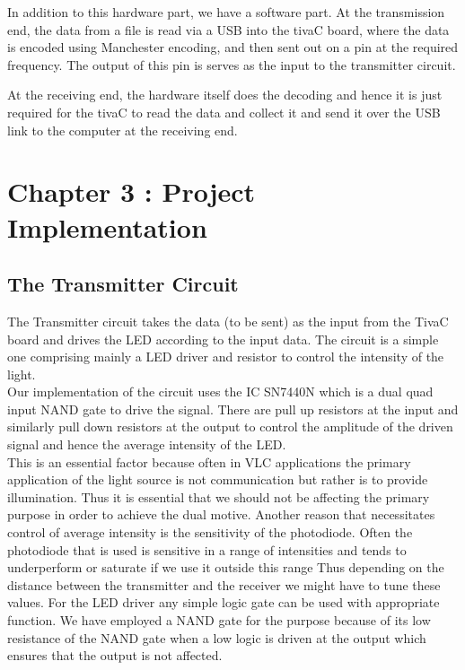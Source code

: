 \documentclass{article}
\begin{document}
In addition to this hardware part,  we have a software part. At the transmission end, the data from a file is read via a USB into the tivaC board, where the data is encoded using Manchester encoding, and then sent out on a pin at the required frequency. The output of this pin is serves as the input to the transmitter circuit. 

At the receiving end, the hardware itself does the decoding and hence it is just required for the tivaC to read the data and collect it and send it over the USB link to the computer at the receiving end.



\section{Chapter 3 : Project Implementation}
\subsection{The Transmitter Circuit}
The Transmitter circuit takes the data (to be sent) as the input from the TivaC board and drives the LED according to the input data. The circuit is a simple one comprising mainly a LED driver  and resistor to control the intensity of the light.\\
Our implementation of the circuit uses the IC SN7440N which is a dual quad input NAND gate to drive the signal. There are pull up resistors at the input and similarly pull down resistors at the output to control the amplitude of the driven signal and hence the average intensity of the LED.\\
This is an essential factor because often in VLC applications the primary application of the light source is not communication but rather is to provide illumination. Thus it is essential that we should not be affecting the primary purpose in order to achieve the dual motive. Another reason that necessitates control of average intensity is the sensitivity of the photodiode. Often the photodiode that is used is sensitive in a range of intensities and tends to underperform or saturate if we use it outside this range Thus depending on the distance between the transmitter and the receiver we might have to tune these values. For the LED driver any simple logic gate can be used with appropriate function. We have employed a NAND gate for the purpose because of its low resistance of the NAND gate when a low logic is driven at the output which ensures that the output is not affected.
\end{document}
